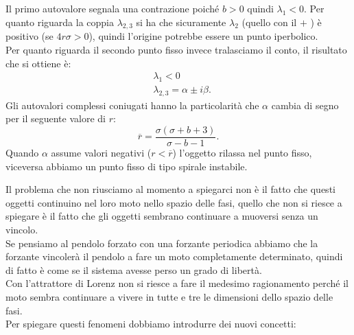 \begin{exmp}
    Il primo autovalore segnala una contrazione poiché $b>0$ quindi $\lambda_1<0$. Per quanto riguarda la coppia $\lambda_{2, 3}$ si ha che sicuramente $\lambda_2$ (quello con il $+$ ) è positivo (se $4r\sigma  > 0$), quindi l'origine potrebbe essere un punto iperbolico.	\\
    Per quanto riguarda il secondo punto fisso invece tralasciamo il conto, il risultato che si ottiene è:
    \[\begin{aligned}
	&\lambda_1 < 0\\
	& \lambda_{2,3} = \alpha\pm i\beta
    .\end{aligned}\]
    Gli autovalori complessi coniugati hanno la particolarità che $\alpha$ cambia di segno per il seguente valore di $r$:
    \[
	\overline{r} = \frac{\sigma  (\sigma  + b + 3)}{\sigma-b-1}
    .\] 
    Quando $\alpha$ assume valori negativi ($r<\overline{r}$) l'oggetto rilassa nel punto fisso, viceversa abbiamo un punto fisso di tipo spirale instabile.
\end{exmp}
\noindent
Il problema che non riusciamo al momento a spiegarci non è il fatto che questi oggetti continuino nel loro moto nello spazio delle fasi, quello che non si riesce a spiegare è il fatto che gli oggetti sembrano continuare a muoversi senza un vincolo. \\
Se pensiamo al pendolo forzato con una forzante periodica abbiamo che la forzante vincolerà il pendolo a fare un moto completamente determinato, quindi di fatto è come se il sistema avesse perso un grado di libertà. \\ 
Con l'attrattore di Lorenz non si riesce a fare il medesimo ragionamento perché il moto sembra continuare a vivere in tutte e tre le dimensioni dello spazio delle fasi.\\
Per spiegare questi fenomeni dobbiamo introdurre dei nuovi concetti: 
